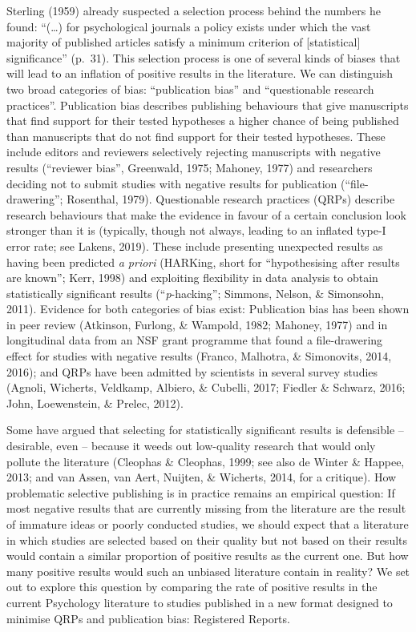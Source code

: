 \documentclass[british,,jou,floatsintext]{apa6}
\begin{document}
Sterling (1959) already suspected a selection process behind the numbers he found:
\enquote{(\ldots{}) for psychological journals a policy exists under which the vast majority of published articles satisfy a minimum criterion of {[}statistical{]} significance} (p.~31).
This selection process is one of several kinds of biases that will lead to an inflation of positive results in the literature.
We can distinguish two broad categories of bias: \enquote{publication bias} and \enquote{questionable research practices}.
Publication bias describes publishing behaviours that give manuscripts that find support for their tested hypotheses a higher chance of being published than manuscripts that do not find support for their tested hypotheses.
These include editors and reviewers selectively rejecting manuscripts with negative results (``reviewer bias'', Greenwald, 1975; Mahoney, 1977) and researchers deciding not to submit studies with negative results for publication (``file-drawering''; Rosenthal, 1979).
Questionable research practices (QRPs) describe research behaviours that make the evidence in favour of a certain conclusion look stronger than it is (typically, though not always, leading to an inflated type-I error rate; see Lakens, 2019).
These include presenting unexpected results as having been predicted \emph{a priori} (HARKing, short for ``hypothesising after results are known''; Kerr, 1998) and exploiting flexibility in data analysis to obtain statistically significant results (``\emph{p}-hacking''; Simmons, Nelson, \& Simonsohn, 2011).
Evidence for both categories of bias exist:
Publication bias has been shown in peer review (Atkinson, Furlong, \& Wampold, 1982; Mahoney, 1977) and in longitudinal data from an NSF grant programme that found a file-drawering effect for studies with negative results (Franco, Malhotra, \& Simonovits, 2014, 2016); and QRPs have been admitted by scientists in several survey studies (Agnoli, Wicherts, Veldkamp, Albiero, \& Cubelli, 2017; Fiedler \& Schwarz, 2016; John, Loewenstein, \& Prelec, 2012).

Some have argued that selecting for statistically significant results is defensible -- desirable, even -- because it weeds out low-quality research that would only pollute the literature (Cleophas \& Cleophas, 1999; see also de Winter \& Happee, 2013; and van Assen, van Aert, Nuijten, \& Wicherts, 2014, for a critique).
How problematic selective publishing is in practice remains an empirical question:
If most negative results that are currently missing from the literature are the result of immature ideas or poorly conducted studies, we should expect that a literature in which studies are selected based on their quality but not based on their results would contain a similar proportion of positive results as the current one.
But how many positive results would such an unbiased literature contain in reality?
We set out to explore this question by comparing the rate of positive results in the current Psychology literature to studies published in a new format designed to minimise QRPs and publication bias: Registered Reports.
\end{document}

